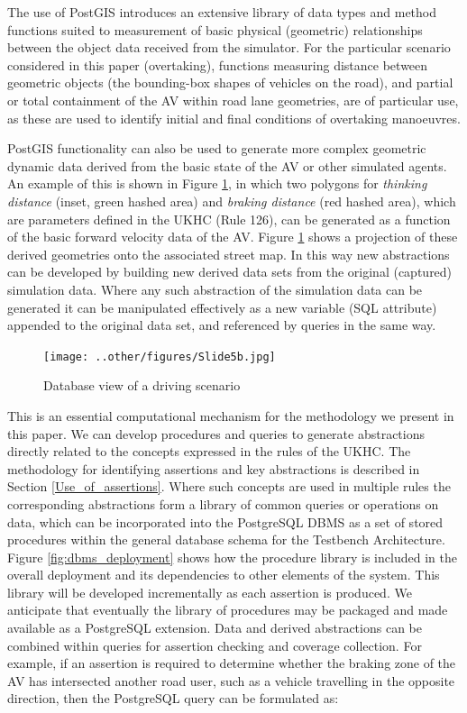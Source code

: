 The use of PostGIS introduces an extensive library of data types and method functions suited to measurement of basic physical (geometric) relationships between the  object data received from the simulator. For the particular scenario considered in this paper (overtaking), functions measuring distance between geometric objects (the bounding-box shapes of vehicles on the road), and partial or total containment of the AV within road lane geometries, are of particular use, as these are used to identify initial and final conditions of overtaking manoeuvres.

PostGIS functionality can also be used to generate more complex geometric dynamic data derived from the basic state of the AV or other simulated agents. An example of this is shown in Figure \ref{fig:assertion_database_annotated}, in which two polygons for \textit{thinking distance} (inset, green hashed area) and \textit{braking distance} (red hashed area), which are parameters defined in the UKHC (Rule 126), can be generated as a function of the basic forward velocity data of the AV. Figure \ref{fig:assertion_database_annotated} shows a projection of these derived geometries onto the associated street map. In this way new abstractions can be developed by building new derived data sets from the original (captured) simulation data. Where any such abstraction of the simulation data can be generated it can be manipulated effectively as a new variable (SQL attribute) appended to the original data set, and referenced by queries in the same way.

\begin{figure}[h!]
    \centering
    \texttt{[image: ..other/figures/Slide5b.jpg]}
    \caption{Database view of a driving scenario}
    \label{fig:assertion_database_annotated}
\end{figure}


This is an essential computational mechanism for the methodology we present in this paper. We can develop procedures and queries to generate abstractions directly related to the concepts expressed in the rules of the UKHC. The methodology for identifying assertions and key abstractions is described in Section \ref{Use_of_assertions}. Where such concepts are used in multiple rules the corresponding abstractions form a library of common queries or operations on data, which can be incorporated into the PostgreSQL DBMS as a set of stored procedures within the general database schema for the Testbench Architecture.  Figure \ref{fig:dbms_deployment} shows how the procedure library is included in the overall deployment and its dependencies to other elements of the system. This library will be developed incrementally as each assertion is produced. We anticipate that eventually the library of procedures may be packaged and made available as a PostgreSQL extension. 
Data and derived abstractions can be combined within queries for assertion checking and coverage collection. For example, if an assertion is required to determine whether the braking zone of the AV has intersected another road user, such as a vehicle travelling in the opposite direction, then the PostgreSQL query can be formulated as:

